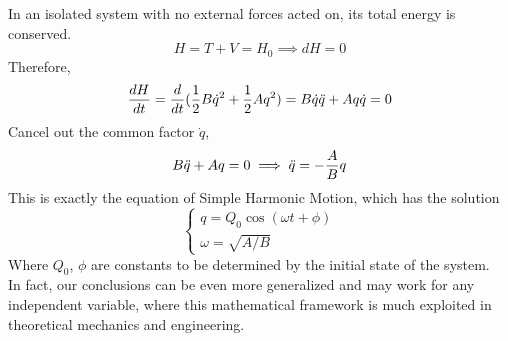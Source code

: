 \documentclass[11pt]{article}
\theoremstyle{gangnamstyle}{\newtheorem{definition}{Definition}[]}
\theoremstyle{gangnamstyle}{\newtheorem{example}{Example}[]}
\theoremstyle{gangnamstyle}{\newtheorem{problem}{Problem}[]}
\theoremstyle{gangnamstyle}{\newtheorem{warning}{Warning}[]}
\begin{document}
In an isolated system with no external forces acted on, its total energy is conserved. 
\[ H = T + V = H_0 \implies dH = 0 \]
Therefore, 
\[ \frac{dH}{dt} = \frac{d}{dt}(\frac{1}{2} B\Dot{q}^2 + \frac{1}{2} Aq^2) = B\Dot{q}\Ddot{q} + Aq\Dot{q} = 0 \]
Cancel out the common factor $\Dot{q}$, 
\[ B\Ddot{q} + Aq = 0 \implies \Ddot{q} = -\frac{A}{B}q \]
This is exactly the equation of Simple Harmonic Motion, which has the solution
\[ \begin{cases}
q = Q_0\cos(\omega t + \phi) \\ 
\omega = \sqrt{A / B}
\end{cases} \]
Where $Q_0$, $\phi$ are constants to be determined by the initial state of the system. \\

In fact, our conclusions can be even more generalized and may work for any independent variable, where this mathematical framework is much exploited in theoretical mechanics and engineering. 
\end{document}
